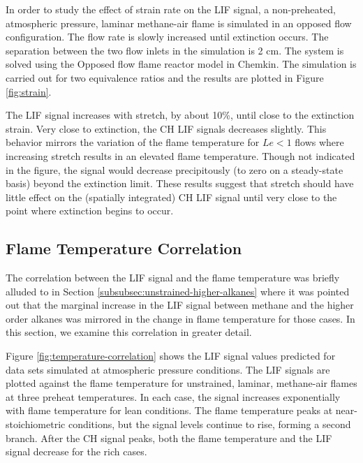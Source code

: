 In order to study the effect of strain rate on the LIF signal, a non-preheated, atmospheric pressure, laminar methane-air flame is simulated in an opposed flow configuration.
The flow rate is slowly increased until extinction occurs.
The separation between the two flow inlets in the simulation is 2 cm.
The system is solved using the Opposed flow flame reactor model in Chemkin.
The simulation is carried out for two equivalence ratios and the results are plotted in Figure \ref{fig:strain}.




The LIF signal increases with stretch, by about 10\%, until close to the extinction strain.
Very close to extinction, the CH LIF signals decreases slightly.
This behavior mirrors the variation of the flame temperature for \(Le<1\) flows where increasing stretch results in an elevated flame temperature.
Though not indicated in the figure, the signal would decrease precipitously (to zero on a steady-state basis) beyond the extinction limit.
These results suggest that stretch should have little effect on the (spatially integrated) CH LIF signal until very close to the point where extinction begins to occur.


\subsection{Flame Temperature Correlation}

The correlation between the LIF signal and the flame temperature was briefly alluded to in Section \ref{subsubsec:unstrained-higher-alkanes} where it was pointed out that the marginal increase in the LIF signal between methane and the higher order alkanes was mirrored in the change in flame temperature for those cases.
In this section, we examine this correlation in greater detail.

Figure \ref{fig:temperature-correlation} shows the LIF signal values predicted for data sets simulated at atmospheric pressure conditions.
The LIF signals are plotted against the flame temperature for unstrained, laminar, methane-air flames at three preheat temperatures.
In each case, the signal increases exponentially with flame temperature for lean conditions.
The flame temperature peaks at near-stoichiometric conditions, but the signal levels continue to rise, forming a second branch.
After the CH signal peaks, both the flame temperature and the LIF signal decrease for the rich cases.

